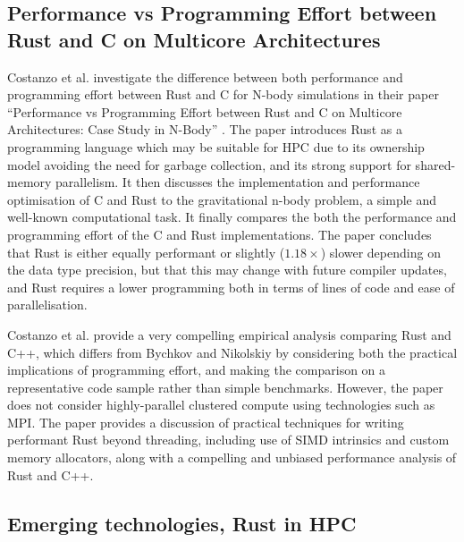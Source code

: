 
\subsection{Performance vs Programming Effort between Rust and C on Multicore Architectures}
\label{ssec:costanzo-et-al}

Costanzo et al. investigate the difference between both performance and programming effort between Rust and C for N-body simulations in their paper ``Performance vs Programming Effort between Rust and C on Multicore Architectures: Case Study in N-Body'' \cite{costanzoPerformanceVsProgramming2021}. The paper introduces Rust as a programming language which may be suitable for \acrshort{HPC} due to its ownership model avoiding the need for garbage collection, and its strong support for shared-memory parallelism. It then discusses the implementation and performance optimisation of C and Rust to the gravitational n-body problem, a simple and well-known computational task. It finally compares the both the performance and programming effort of the C and Rust implementations. The paper concludes that Rust is either equally performant or slightly ($1.18\times$) slower depending on the data type precision, but that this may change with future compiler updates, and Rust requires a lower programming both in terms of lines of code and ease of parallelisation.

Costanzo et al. provide a very compelling empirical analysis comparing Rust and C++, which differs from Bychkov and Nikolskiy by considering both the practical implications of programming effort, and making the comparison on a representative code sample rather than simple benchmarks. However, the paper does not consider highly-parallel clustered compute using technologies such as MPI. The paper provides a discussion of practical techniques for writing performant Rust beyond threading, including use of SIMD intrinsics and custom memory allocators, along with a compelling and unbiased performance analysis of Rust and C++.


\subsection{Emerging technologies, Rust in HPC}
\label{ssec:moran-bull}

